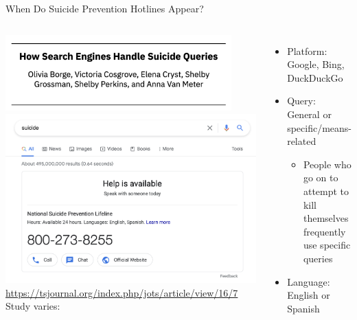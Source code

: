 \documentclass[nobackground,dvipsnames,table,aspectratio=169]{beamer}
\begin{document}
\begin{frame}{When Do Suicide Prevention Hotlines Appear?}
    \begin{columns}
            \centering
            \includegraphics[width=0.9\textwidth]{hsehsq-title}
            \includegraphics[width=\textwidth]{google-suicide-query-result}
            \tiny
            \url{https://tsjournal.org/index.php/jots/article/view/16/7}
            Study varies:
            \begin{itemize}
                \small
                \item Platform: Google, Bing, DuckDuckGo
                \item Query: General or specific/means-related
                \begin{itemize}
                    \footnotesize
                    \item People who go on to attempt to kill themselves frequently use specific queries
                \end{itemize}
                \item Language: English or Spanish
            \end{itemize}
    \end{columns}
\end{frame}
\end{document}

